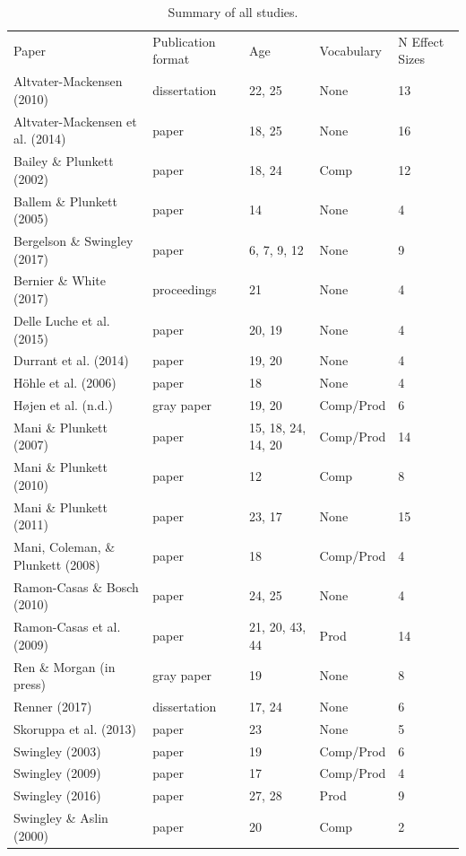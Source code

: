 \documentclass[man]{apa6}
\makeatletter
\newenvironment{lltable}{\begin{landscape}\begin{center}\begin{ThreePartTable}}{\end{ThreePartTable}\end{center}\end{landscape}}
\newcommand\LastLTentrywidth{1em}
\newlength\longtablewidth
\newcommand{\getlongtablewidth}{\begingroup \ifcsname LT@\roman{LT@tables}\endcsname \global\longtablewidth=0pt \renewcommand{\LT@entry}[2]{\global\advance\longtablewidth by ##2\relax\gdef\LastLTentrywidth{##2}}\@nameuse{LT@\roman{LT@tables}} \fi \endgroup}
\theoremstyle{definition}
\theoremstyle{definition}
\theoremstyle{definition}
\theoremstyle{remark}
\makeatother
\begin{document}
\begin{lltable}


\begin{longtable}{lllll}\noalign{\getlongtablewidth\global\LTcapwidth=\longtablewidth}
\caption{\label{tab:SummaryTable}Summary of all studies.}\\
\toprule
Paper & Publication format & Age & Vocabulary & N Effect Sizes\\
\midrule
Altvater-Mackensen (2010) & dissertation & 22, 25 & None & 13\\
Altvater-Mackensen et al. (2014) & paper & 18, 25 & None & 16\\
Bailey \& Plunkett (2002) & paper & 18, 24 & Comp & 12\\
Ballem \& Plunkett (2005) & paper & 14 & None & 4\\
Bergelson \& Swingley (2017) & paper & 6, 7, 9, 12 & None & 9\\
Bernier \& White (2017) & proceedings & 21 & None & 4\\
Delle Luche et al. (2015) & paper & 20, 19 & None & 4\\
Durrant et al. (2014) & paper & 19, 20 & None & 4\\
Höhle et al. (2006) & paper & 18 & None & 4\\
Højen et al. (n.d.) & gray paper & 19, 20 & Comp/Prod & 6\\
Mani \& Plunkett (2007) & paper & 15, 18, 24, 14, 20 & Comp/Prod & 14\\
Mani \& Plunkett (2010) & paper & 12 & Comp & 8\\
Mani \& Plunkett (2011) & paper & 23, 17 & None & 15\\
Mani, Coleman, \& Plunkett (2008) & paper & 18 & Comp/Prod & 4\\
Ramon-Casas \& Bosch (2010) & paper & 24, 25 & None & 4\\
Ramon-Casas et al. (2009) & paper & 21, 20, 43, 44 & Prod & 14\\
Ren \& Morgan (in press) & gray paper & 19 & None & 8\\
Renner (2017) & dissertation & 17, 24 & None & 6\\
Skoruppa et al. (2013) & paper & 23 & None & 5\\
Swingley (2003) & paper & 19 & Comp/Prod & 6\\
Swingley (2009) & paper & 17 & Comp/Prod & 4\\
Swingley (2016) & paper & 27, 28 & Prod & 9\\
Swingley \& Aslin (2000) & paper & 20 & Comp & 2\\

\end{longtable}
\end{lltable}
\end{document}
